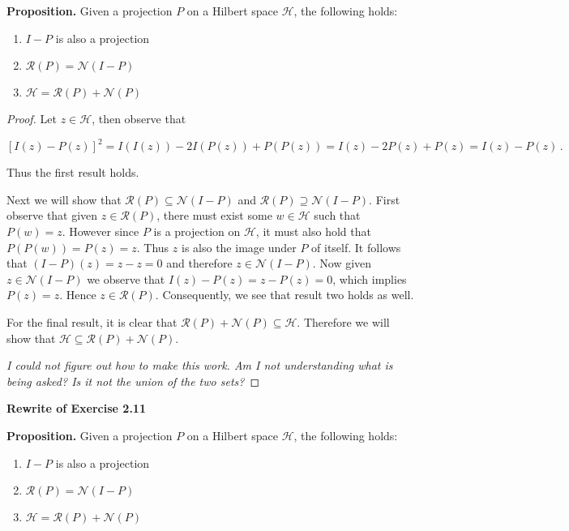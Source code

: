 \documentclass[a4paper]{article}
\numberwithin{equation}{section}
\begin{document}
\begin{description}
\item \textbf{Proposition.} Given a projection $P$ on a Hilbert space $\mathcal{H}$, the following holds:

\begin{enumerate}

\item $I-P$ is also a projection
\item $\mathcal{R}(P) = \mathcal{N}(I-P)$
\item $\mathcal{H} = \mathcal{R}(P) + \mathcal{N}(P)$

\end{enumerate}

\begin{proof} Let $z \in \mathcal{H}$, then observe that

$$[I(z) - P(z)]^2 = I(I(z)) -2I(P(z)) + P(P(z)) = I(z) - 2P(z) + P(z) = I(z) - P(z)\,.$$

Thus the first result holds. 

Next we will show that $\mathcal{R}(P) \subseteq \mathcal{N}(I-P)$ and $\mathcal{R}(P) \supseteq \mathcal{N}(I-P)$. First observe that given $z \in \mathcal{R}(P)$, there must exist some $w \in \mathcal{H}$ such that $P(w) = z$. However since $P$ is a projection on $\mathcal{H}$, it must also hold that $P(P(w)) = P(z) = z$. Thus $z$ is also the image under $P$ of itself. It follows that $(I-P)(z) = z-z = 0$ and therefore $z \in \mathcal{N}(I-P)$. Now given $z \in \mathcal{N}(I-P)$ we observe that $I(z) - P(z) = z - P(z) = 0$, which implies $P(z) = z$. Hence $z \in \mathcal{R}(P)$. Consequently, we see that result two holds as well.

For the final result, it is clear that $\mathcal{R}(P)+\mathcal{N}(P) \subseteq \mathcal{H}$. Therefore we will show that $\mathcal{H} \subseteq \mathcal{R}(P)+\mathcal{N}(P)$. 

\textit{I could not figure out how to make this work. Am I not understanding what is being asked? Is it not the union of the two sets?}

\end{proof}


\item \textbf{Rewrite of Exercise 2.11}

\item \textbf{Proposition.} Given a projection $P$ on a Hilbert space $\mathcal{H}$, the following holds:

\begin{enumerate}

\item $I-P$ is also a projection
\item $\mathcal{R}(P) = \mathcal{N}(I-P)$
\item $\mathcal{H} = \mathcal{R}(P) + \mathcal{N}(P)$


\end{enumerate}
\end{description}
\end{document}
